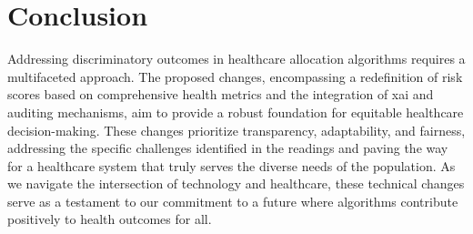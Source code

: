 \documentclass[11pt,showkeys]{essay}
\begin{document}
\section{Conclusion}

Addressing discriminatory outcomes in healthcare allocation algorithms requires a multifaceted approach. The proposed changes, encompassing a redefinition of risk scores based on comprehensive health metrics and the integration of \gls{xai} and auditing mechanisms, aim to provide a robust foundation for equitable healthcare decision-making. These changes prioritize transparency, adaptability, and fairness, addressing the specific challenges identified in the readings and paving the way for a healthcare system that truly serves the diverse needs of the population. As we navigate the intersection of technology and healthcare, these technical changes serve as a testament to our commitment to a future where algorithms contribute positively to health outcomes for all.


\end{document}
